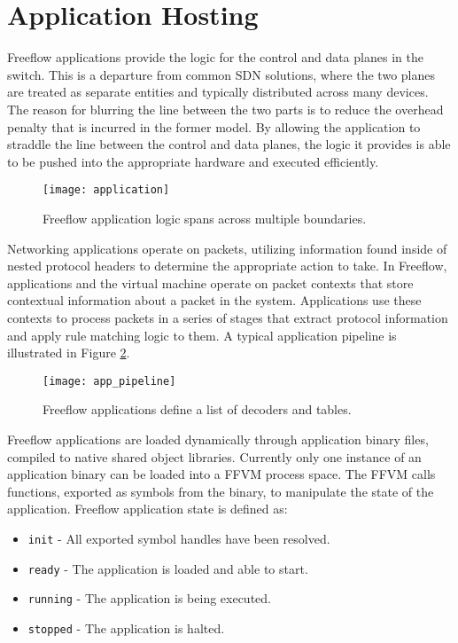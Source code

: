 \section{Application Hosting}
\label{ff:app}
Freeflow applications provide the logic for the control and data planes in the
switch. This is a departure from common SDN solutions, where the two planes are
treated as separate entities and typically distributed across many devices.
The reason for blurring the line between the two parts is to reduce the overhead
penalty that is incurred in the former model. By allowing the application to
straddle the line between the control and data planes, the logic it provides is
able to be pushed into the appropriate hardware and executed efficiently.

\begin{figure}[h]
\centering
\texttt{[image: application]}
\caption{Freeflow application logic spans across multiple boundaries.}
\label{app}
\end{figure}

Networking applications operate on packets, utilizing information found inside
of nested protocol headers to determine the appropriate action to take. In
Freeflow, applications and the virtual machine operate on packet contexts
that store contextual information about a packet in the system. Applications
use these contexts to process packets in a series of stages that extract
protocol information and apply rule matching logic to them. A typical
application pipeline is illustrated in Figure \ref{app_pipeline}.

\begin{figure}[h]
\centering
\texttt{[image: app\_pipeline]}
\caption{Freeflow applications define a list of decoders and tables.}
\label{app_pipeline}
\end{figure}

Freeflow applications are loaded dynamically through application binary
files, compiled to native shared object libraries. Currently only one instance
of an application binary can be loaded into a FFVM process space. The FFVM
calls functions, exported as symbols from the binary, to manipulate the state
of the application. Freeflow application state is defined as:

\begin{itemize}
  \item \texttt{init} - All exported symbol handles have been resolved.
  \item \texttt{ready} - The application is loaded and able to start.
  \item \texttt{running} - The application is being executed.
  \item \texttt{stopped} - The application is halted.
\end{itemize}

